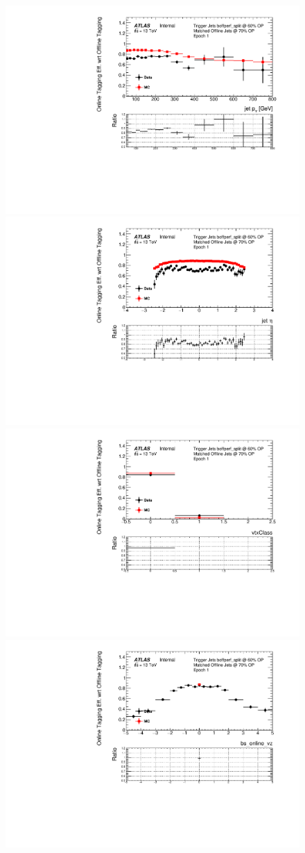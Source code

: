
\begin{figure}[!ht]
\begin{center}
  \includegraphics[width=0.45\linewidth, angle=0]{figs/Trigger/btrigger_old/Epoch1_trigReq_eff_jetPt.pdf}
  \includegraphics[width=0.45\linewidth, angle=0]{figs/Trigger/btrigger_old/Epoch1_trigReq_eff_jetEta.pdf} \\
  \includegraphics[width=0.45\linewidth, angle=0]{figs/Trigger/btrigger_old/Epoch1_trigReq_eff_vtxClass.pdf}
  \includegraphics[width=0.45\linewidth, angle=0]{figs/Trigger/btrigger_old/Epoch1_trigReq_eff_bs_online_vz.pdf}

\end{center}
\end{figure}
